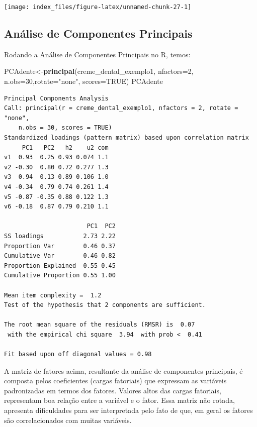 \documentclass[12pt,brazil,oneside]{book}
\newenvironment{Shaded}{\begin{snugshade}}{\end{snugshade}}
\newcommand{\DataTypeTok}[1]{\textcolor[rgb]{0.13,0.29,0.53}{#1}}
\newcommand{\DecValTok}[1]{\textcolor[rgb]{0.00,0.00,0.81}{#1}}
\newcommand{\KeywordTok}[1]{\textcolor[rgb]{0.13,0.29,0.53}{\textbf{#1}}}
\newcommand{\NormalTok}[1]{#1}
\newcommand{\OtherTok}[1]{\textcolor[rgb]{0.56,0.35,0.01}{#1}}
\newcommand{\StringTok}[1]{\textcolor[rgb]{0.31,0.60,0.02}{#1}}
\begin{document}
\begin{center}\texttt{[image: index\_files/figure-latex/unnamed-chunk-27-1]} \end{center}

\hypertarget{analise-de-componentes-principais}{%
\subsection{Análise de Componentes
Principais}\label{analise-de-componentes-principais}}

Rodando a Análise de Componentes Principais no R, temos:

\begin{Shaded}
\begin{Highlighting}[]
\NormalTok{PCAdente<-}\KeywordTok{principal}\NormalTok{(creme_dental_exemplo1, }\DataTypeTok{nfactors=}\DecValTok{2}\NormalTok{,}
                \DataTypeTok{n.obs=}\DecValTok{30}\NormalTok{,}\DataTypeTok{rotate=}\StringTok{"none"}\NormalTok{, }\DataTypeTok{scores=}\OtherTok{TRUE}\NormalTok{)}
\NormalTok{PCAdente}
\end{Highlighting}
\end{Shaded}

\begin{verbatim}
Principal Components Analysis
Call: principal(r = creme_dental_exemplo1, nfactors = 2, rotate = "none", 
    n.obs = 30, scores = TRUE)
Standardized loadings (pattern matrix) based upon correlation matrix
     PC1   PC2   h2    u2 com
v1  0.93  0.25 0.93 0.074 1.1
v2 -0.30  0.80 0.72 0.277 1.3
v3  0.94  0.13 0.89 0.106 1.0
v4 -0.34  0.79 0.74 0.261 1.4
v5 -0.87 -0.35 0.88 0.122 1.3
v6 -0.18  0.87 0.79 0.210 1.1

                       PC1  PC2
SS loadings           2.73 2.22
Proportion Var        0.46 0.37
Cumulative Var        0.46 0.82
Proportion Explained  0.55 0.45
Cumulative Proportion 0.55 1.00

Mean item complexity =  1.2
Test of the hypothesis that 2 components are sufficient.

The root mean square of the residuals (RMSR) is  0.07 
 with the empirical chi square  3.94  with prob <  0.41 

Fit based upon off diagonal values = 0.98
\end{verbatim}

A matriz de fatores acima, resultante da análise de componentes
principais, é composta pelos coeficientes (cargas fatoriais) que
expressam as variáveis padronizadas em termos dos fatores. Valores altos
das cargas fatoriais, representam boa relação entre a variável e o
fator. Essa matriz não rotada, apresenta dificuldades para ser
interpretada pelo fato de que, em geral os fatores são correlacionados
com muitas variáveis.
\end{document}
